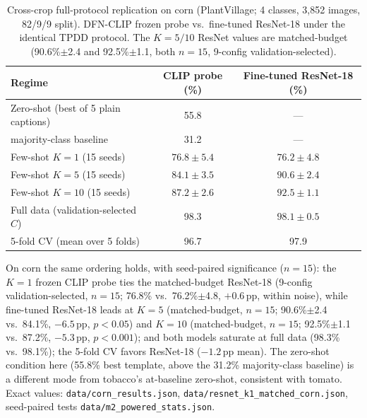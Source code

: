 \documentclass[10pt,a4paper]{article}
\begin{document}
\begin{table}[!ht]
\centering
\caption{Cross-crop full-protocol replication on corn (PlantVillage; 4 classes, 3{,}852 images, 82/9/9 split). DFN-CLIP frozen probe vs.\ fine-tuned ResNet-18 under the identical TPDD protocol. The $K{=}5/10$ ResNet values are matched-budget (90.6\%$\pm$2.4 and 92.5\%$\pm$1.1, both $n{=}15$, 9-config validation-selected).}
\label{tab:corn}
\begin{tabular}{lcc}
\toprule
\textbf{Regime} & \textbf{CLIP probe (\%)} & \textbf{Fine-tuned ResNet-18 (\%)} \\
\midrule
Zero-shot (best of 5 plain captions) & 55.8 & --- \\
\quad majority-class baseline       & 31.2 & --- \\
Few-shot $K{=}1$  (15 seeds) & $76.8\pm5.4$ & $76.2\pm4.8$ \\
Few-shot $K{=}5$  (15 seeds) & $84.1\pm3.5$ & $90.6\pm2.4$ \\
Few-shot $K{=}10$ (15 seeds) & $87.2\pm2.6$ & $92.5\pm1.1$ \\
Full data (validation-selected $C$) & 98.3 & $98.1\pm0.5$ \\
5-fold CV (mean over 5 folds) & 96.7 & 97.9 \\
\bottomrule
\end{tabular}
\end{table}

On corn the same ordering holds, with seed-paired significance ($n{=}15$): the $K{=}1$ frozen CLIP probe ties the matched-budget ResNet-18 (9-config validation-selected, $n{=}15$; 76.8\% vs.\ 76.2\%$\pm$4.8, $+0.6$\,pp, within noise), while fine-tuned ResNet-18 leads at $K{=}5$ (matched-budget, $n{=}15$; 90.6\%$\pm$2.4 vs.\ 84.1\%, $-6.5$\,pp, $p{<}0.05$) and $K{=}10$ (matched-budget, $n{=}15$; 92.5\%$\pm$1.1 vs.\ 87.2\%, $-5.3$\,pp, $p{<}0.001$); and both models saturate at full data (98.3\% vs.\ 98.1\%); the 5-fold CV favors ResNet-18 ($-1.2$\,pp mean). The zero-shot condition here (55.8\% best template, above the 31.2\% majority-class baseline) is a different mode from tobacco's at-baseline zero-shot, consistent with tomato. Exact values: \texttt{data/corn\_results.json}, \texttt{data/resnet\_k1\_matched\_corn.json}, seed-paired tests \texttt{data/m2\_powered\_stats.json}.
\end{document}
